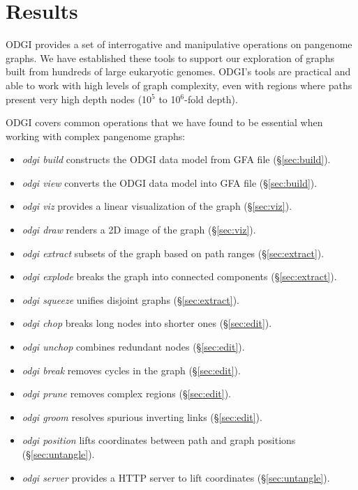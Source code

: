 \documentclass{bioinfo}
\begin{document}


\section{Results}

ODGI provides a set of interrogative and manipulative operations on pangenome graphs.
We have established these tools to support our exploration of graphs built from hundreds of large eukaryotic genomes.
ODGI's tools are practical and able to work with high levels of graph complexity, even with regions where paths present very high depth nodes (10$^5$ to 10$^6$-fold depth).

ODGI covers common operations that we have found to be essential when working with complex pangenome graphs:

\begin{itemize}
\item \textit{odgi build} constructs the ODGI data model from GFA file (\S\ref{sec:build}).
\item \textit{odgi view} converts the ODGI data model into GFA file (\S\ref{sec:build}).
\item \textit{odgi viz} provides a linear visualization of the graph (\S\ref{sec:viz}).
\item \textit{odgi draw} renders a 2D image of the graph (\S\ref{sec:viz}).
\item \textit{odgi extract} subsets of the graph based on path ranges (\S\ref{sec:extract}).
\item \textit{odgi explode} breaks the graph into connected components (\S\ref{sec:extract}).
\item \textit{odgi squeeze} unifies disjoint graphs (\S\ref{sec:extract}).
\item \textit{odgi chop} breaks long nodes into shorter ones (\S\ref{sec:edit}).
\item \textit{odgi unchop} combines redundant nodes (\S\ref{sec:edit}).
\item \textit{odgi break} removes cycles in the graph (\S\ref{sec:edit}).
\item \textit{odgi prune} removes complex regions (\S\ref{sec:edit}).
\item \textit{odgi groom} resolves spurious inverting links (\S\ref{sec:edit}).
\item \textit{odgi position} lifts coordinates between path and graph positions (\S\ref{sec:untangle}).
\item \textit{odgi server} provides a HTTP server to lift coordinates (\S\ref{sec:untangle}).

\end{itemize}
\end{document}
